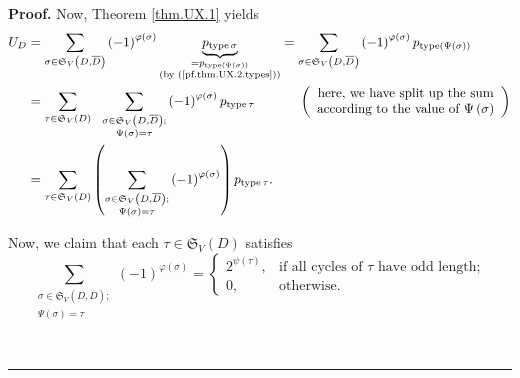 \documentclass[numbers=enddot,12pt,final,onecolumn,notitlepage]{scrartcl}%
\numberwithin{exer}{section}
\theoremstyle{definition}
\newenvironment{proof}[1][Proof]{\noindent\textbf{#1.} }{\ \rule{0.5em}{0.5em}}
\let\sumnonlimits\sum
\renewcommand{\sum}{\sumnonlimits\limits}
\begin{document}
\begin{proof}
Now, Theorem \ref{thm.UX.1} yields%
\begin{align}
U_{D}  &  =\sum_{\sigma\in\mathfrak{S}_{V}\left(  D,\overline{D}\right)
}\left(  -1\right)  ^{\varphi\left(  \sigma\right)  }%
\underbrace{p_{\operatorname*{type}\sigma}}%
_{\substack{=p_{\operatorname*{type}\left(  \Psi\left(  \sigma\right)
\right)  }\\\text{(by (\ref{pf.thm.UX.2.types}))}}}=\sum_{\sigma
\in\mathfrak{S}_{V}\left(  D,\overline{D}\right)  }\left(  -1\right)
^{\varphi\left(  \sigma\right)  }p_{\operatorname*{type}\left(  \Psi\left(
\sigma\right)  \right)  }\nonumber\\
&  =\sum_{\tau\in\mathfrak{S}_{V}\left(  D\right)  }\ \ \sum_{\substack{\sigma
\in\mathfrak{S}_{V}\left(  D,\overline{D}\right)  ;\\\Psi\left(
\sigma\right)  =\tau}}\left(  -1\right)  ^{\varphi\left(  \sigma\right)
}p_{\operatorname*{type}\tau}\ \ \ \ \ \ \ \ \ \ \left(
\begin{array}
[c]{c}%
\text{here, we have split up the sum}\\
\text{according to the value of }\Psi\left(  \sigma\right)
\end{array}
\right) \nonumber\\
&  =\sum_{\tau\in\mathfrak{S}_{V}\left(  D\right)  }\left(  \sum
_{\substack{\sigma\in\mathfrak{S}_{V}\left(  D,\overline{D}\right)
;\\\Psi\left(  \sigma\right)  =\tau}}\left(  -1\right)  ^{\varphi\left(
\sigma\right)  }\right)  p_{\operatorname*{type}\tau}. \label{pf.thm.UX.2.2}%
\end{align}


Now, we claim that each $\tau\in\mathfrak{S}_{V}\left(  D\right)  $ satisfies%
\begin{equation}
\sum_{\substack{\sigma\in\mathfrak{S}_{V}\left(  D,\overline{D}\right)
;\\\Psi\left(  \sigma\right)  =\tau}}\left(  -1\right)  ^{\varphi\left(
\sigma\right)  }=%
\begin{cases}
2^{\psi\left(  \tau\right)  }, & \text{if all cycles of }\tau\text{ have odd
length};\\
0, & \text{otherwise.}%
\end{cases}
\label{pf.thm.UX.2.cancel}%
\end{equation}



\end{proof}
\end{document}
